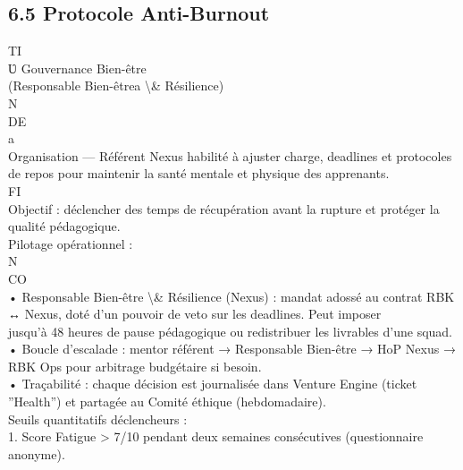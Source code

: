 \documentclass[12pt,landscape,a4paper]{article}
\begin{document}
\subsection{6.5 Protocole Anti-Burnout}
\vspace{0.5em}
\vspace{0.5em}
\vspace{0.5em}
\vspace{0.5em}
TI\\
Ʋ Gouvernance Bien-être\\
(Responsable Bien-êtrea \textbackslash{}& Résilience)\\
\vspace{0.5em}
\vspace{0.5em}
\vspace{0.5em}
\vspace{0.5em}
N\\
DE\\
a\\
Organisation — Référent Nexus habilité à ajuster charge, deadlines et protocoles de repos pour maintenir la santé mentale et physique des apprenants.\\
\vspace{0.5em}
\vspace{0.5em}
\vspace{0.5em}
\vspace{0.5em}
FI\\
Objectif : déclencher des temps de récupération avant la rupture et protéger la qualité pédagogique.\\
Pilotage opérationnel :\\
\vspace{0.5em}
\vspace{0.5em}
N\\
CO\\
• Responsable Bien-être \textbackslash{}& Résilience (Nexus) : mandat adossé au contrat RBK ↔ Nexus, doté d’un pouvoir de veto sur les deadlines. Peut imposer\\
jusqu’à 48 heures de pause pédagogique ou redistribuer les livrables d’une squad.\\
• Boucle d’escalade : mentor référent → Responsable Bien-être → HoP Nexus → RBK Ops pour arbitrage budgétaire si besoin.\\
• Traçabilité : chaque décision est journalisée dans Venture Engine (ticket ”Health”) et partagée au Comité éthique (hebdomadaire).\\
Seuils quantitatifs déclencheurs :\\
1. Score Fatigue \textgreater{} 7/10 pendant deux semaines consécutives (questionnaire anonyme).\\
\end{document}
